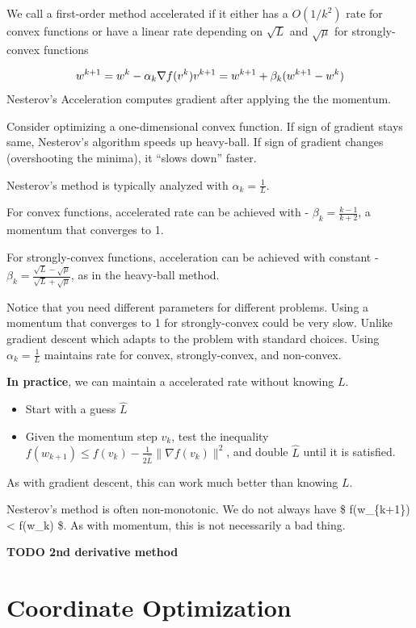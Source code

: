 \documentclass[
]{article}
\begin{document}
We call a first-order method accelerated if it either has a \(O(1/k^2)\) rate for convex functions or have a linear rate depending on \(\sqrt{L}\) and \(\sqrt{\mu}\) for strongly-convex functions

\[
w^{k+1} = w^{k} - \alpha_k \nabla f(v^k) \\
v^{k+1} = w^{k+1} + \beta_k (w^{k+1} - w^{k}) \\
\]
Nesterov's Acceleration computes gradient after applying the the momentum.

Consider optimizing a one-dimensional convex function. If sign of gradient stays same, Nesterov's algorithm speeds up heavy-ball. If sign of gradient changes (overshooting the minima), it ``slows down'' faster.

Nesterov's method is typically analyzed with \(\alpha_k = \frac{1}{L}\).

For convex functions, accelerated rate can be achieved with - \(\beta_k = \frac{k - 1}{k + 2}\), a momentum that converges to 1.

For strongly-convex functions, acceleration can be achieved with constant - \(\beta_k = \frac{\sqrt{L} - \sqrt{\mu}}{\sqrt{L} + \sqrt{\mu}}\), as in the heavy-ball method.

Notice that you need different parameters for different problems. Using a momentum that converges to 1 for strongly-convex could be very slow. Unlike gradient descent which adapts to the problem with standard choices. Using \(\alpha_k = \frac{1}{L}\) maintains rate for convex, strongly-convex, and non-convex.

\textbf{In practice}, we can maintain a accelerated rate without knowing \(L\).

\begin{itemize}
\item
  Start with a guess \(\hat{L}\)
\item
  Given the momentum step \(v_k\), test the inequality
  \(f(w_{k+1}) \leq f(v_k) - \frac{1}{2\hat{L}} \| \nabla f(v_k) \|^2\),
  and double \(\hat{L}\) until it is satisfied.
\end{itemize}

As with gradient descent, this can work much better than knowing \(L\).

Nesterov's method is often non-monotonic. We do not always have \$ f(w\_\{k+1\}) \textless{} f(w\_k) \$. As with momentum, this is not necessarily a bad thing.

\textbf{TODO 2nd derivative method}

\section{Coordinate Optimization}\label{coordinate-optimization}
\end{document}

